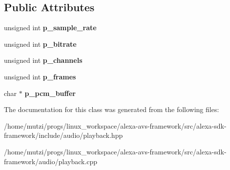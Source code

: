 \subsection*{Public Attributes}
\begin{DoxyCompactItemize}
\item 
\mbox{\label{classAVS_1_1PcmInfo_a6e37bbb4f5b832f4349a31260c6e3adc}} 
unsigned int {\bfseries p\+\_\+sample\+\_\+rate}
\item 
\mbox{\label{classAVS_1_1PcmInfo_ae502a8edea7202b84dc57197790cc570}} 
unsigned int {\bfseries p\+\_\+bitrate}
\item 
\mbox{\label{classAVS_1_1PcmInfo_a700ab6972a89626adccfed8d1b96681d}} 
unsigned int {\bfseries p\+\_\+channels}
\item 
\mbox{\label{classAVS_1_1PcmInfo_ac76c8aca683d7d341a3e428c50181613}} 
unsigned int {\bfseries p\+\_\+frames}
\item 
\mbox{\label{classAVS_1_1PcmInfo_ac80495ba9affcbf142ce319d5a65bc5a}} 
char $\ast$ {\bfseries p\+\_\+pcm\+\_\+buffer}
\end{DoxyCompactItemize}


The documentation for this class was generated from the following files\+:\begin{DoxyCompactItemize}
\item 
/home/mutzi/progs/linux\+\_\+workspace/alexa-\/avs-\/framework/src/alexa-\/sdk-\/framework/include/audio/playback.\+hpp\item 
/home/mutzi/progs/linux\+\_\+workspace/alexa-\/avs-\/framework/src/alexa-\/sdk-\/framework/audio/playback.\+cpp\end{DoxyCompactItemize}
